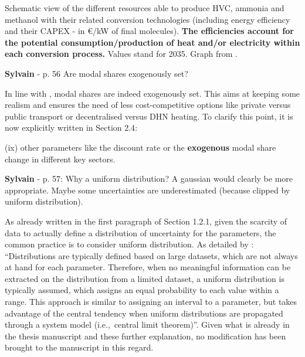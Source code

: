 \documentclass[12pt,a4paper]{article}
\def\ie{i.e.,\ }
\begin{document}
\begin{mdframed}[style=manuscript] %
Schematic view of the different resources able to produce HVC, ammonia and methanol with their related conversion technologies (including energy efficiency and their CAPEX - in €/kW of final molecules).  \textbf{The efficiencies account for the potential consumption/production of heat and/or electricity within each conversion process.} Values stand for 2035. Graph from \cite{rixhon2021comprehensive}.
\end{mdframed}

\begin{mdframed}[style=comment] %
{\color{purple} \textbf{Sylvain}} - p. 56 Are modal shares exogenously set?
\end{mdframed}

\noindent In line with \citet{limpens2019energyscope}, modal shares are indeed exogenously set. This aims at keeping some realism and ensures the need of less cost-competitive options like private versus public transport or decentralised versus DHN heating. To clarify this point, it is now explicitly written {\color{blue}in Section 2.4}:

\begin{mdframed}[style=manuscript] %
[...] (ix) other parameters like the discount rate or the \textbf{exogenous} modal share change in different key sectors.
\end{mdframed}

\begin{mdframed}[style=comment] %
{\color{purple} \textbf{Sylvain}} - p. 57: Why a uniform distribution? A gaussian would clearly be more appropriate. Maybe some uncertainties are underestimated (because clipped by uniform distribution).
\end{mdframed}

\noindent As already written in the first paragraph of Section 1.2.1, given the scarcity of data to actually define a distribution of uncertainty for the parameters, the common practice is to consider uniform distribution. As detailed by \citet{coppittersthesis}: ``Distributions are typically defined based on large datasets, which are not always at hand for each parameter. Therefore, when no meaningful information can be extracted on the distribution from a limited dataset, a uniform distribution is typically assumed, which assigns an equal probability to each value within a range. This approach is similar to assigning an interval to a parameter, but takes advantage of the central tendency when uniform distributions are propagated through a system model (\ie central limit theorem)''. Given what is already in the thesis manuscript and these further explanation, no modification has been brought to the manuscript in this regard. 
\end{document}
